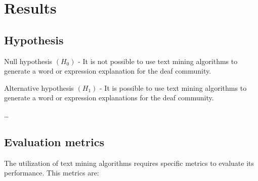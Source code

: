
\chapter{Results} %
\label{chap:Chapter6} 

\section{Hypothesis}

Null hypothesis $(H_0)$ - It is not possible to use text mining algorithms to generate a word or expression explanation for the deaf community.

Alternative hypothesis $(H_1)$ - It is possible to use text mining algorithms to generate a word or expression explanations for the deaf community.

\dots

\section{Evaluation metrics}

The utilization of text mining algorithms requires specific metrics to evaluate its performance.
This metrics are: 

